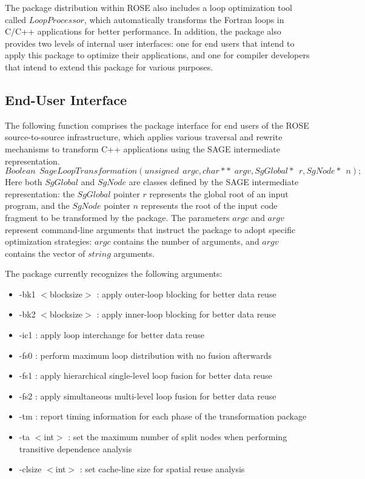 The package distribution within ROSE also includes a loop optimization tool called
$LoopProcessor$, which automatically transforms the {Fortran loops} 
in C/C++ applications for better performance. In addition,
the package also provides two levels of internal user interfaces:
one for end users that intend to apply this package
to optimize their applications, and  one for compiler
developers that intend to extend this package for various purposes.

\subsection{End-User Interface}
\label {sec-interface-user}

The following function comprises the package interface for end users of
the ROSE source-to-source infrastructure,  which applies various traversal
and rewrite mechanisms to transform C++ applications
using the SAGE intermediate representation.
\begin {equation}
  Boolean \ \ SageLoopTransformation( unsigned \ \ argc, char** \ \ argv, SgGlobal* \ \ r, SgNode* \ \ n);
\end {equation}
Here both $SgGlobal$ and $SgNode$ are classes defined by the SAGE intermediate representation:
the $SgGlobal$ pointer $r$ represents the global root of an input program, 
and the $SgNode$ pointer $n$
represents the root of the input code fragment to be transformed by the package.
The parameters $argc$ and $argv$ represent command-line arguments that
instruct the package to adopt specific optimization strategies:
$argc$ contains the number of arguments,
and $argv$ contains the vector of $string$ arguments.

The package currently recognizes the following arguments:
\begin {itemize}
\item {-bk1 $<$blocksize$>$ :} apply outer-loop blocking for better data reuse
\item {-bk2 $<$blocksize$>$ :} apply inner-loop blocking for better data reuse
\item {-ic1 :} apply loop interchange for better data reuse
\item {-fs0 :} perform maximum loop distribution with no fusion afterwards
\item {-fs1 :} apply hierarchical single-level loop fusion for better data reuse
\item {-fs2 :} apply simultaneous multi-level loop fusion for better data reuse
\item {-tm :}  report timing information for each phase of the transformation package
\item {-ta $<$int$>$ :} set the maximum number of split nodes when performing transitive dependence 
                analysis
\item {-clsize $<$int$>$ :} set cache-line size for spatial reuse analysis
\end {itemize}

